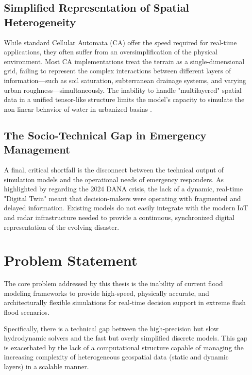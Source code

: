 \subsection{Simplified Representation of Spatial Heterogeneity}

While standard Cellular Automata (CA) offer the speed required for real-time applications, they often suffer from an 
oversimplification of the physical environment. Most CA implementations treat the terrain as a single-dimensional grid, 
failing to represent the complex interactions between different layers of information—such as soil saturation, 
subterranean drainage systems, and varying urban roughness—simultaneously. The inability to handle "multilayered" spatial 
data in a unified tensor-like structure limits the model's capacity to simulate the non-linear behavior of water in 
urbanized basins \parencite{Fonseca2011}.


\subsection{The Socio-Technical Gap in Emergency Management}

A final, critical shortfall is the disconnect between the technical output of simulation models and the operational needs 
of emergency responders. As highlighted by regarding the 2024 DANA crisis, the lack of a dynamic, real-time 
"Digital Twin" meant that decision-makers were operating with fragmented and delayed information. Existing models do not 
easily integrate with the modern IoT and radar infrastructure needed to provide a continuous, synchronized digital 
representation of the evolving disaster.


\section{Problem Statement}

The core problem addressed by this thesis is the inability of current flood modeling frameworks to provide high-speed, 
physically accurate, and architecturally flexible simulations for real-time decision support in extreme flash flood 
scenarios.

Specifically, there is a technical gap between the high-precision but slow hydrodynamic solvers and the fast but overly 
simplified discrete models. This gap is exacerbated by the lack of a computational structure capable of managing the 
increasing complexity of heterogeneous geospatial data (static and dynamic layers) in a scalable manner.

